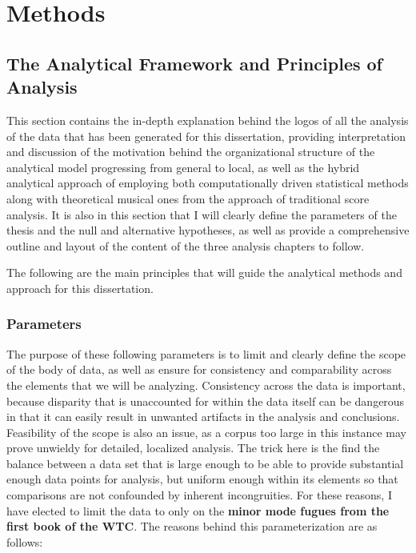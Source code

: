     
    
    
    

    \hypertarget{Methods}{\chapter{Methods}\label{Methods}}
    \section{The Analytical Framework and Principles of
Analysis}\label{the-analytical-framework-and-principles-of-analysis}

    This section contains the in-depth explanation behind the logos of all
the analysis of the data that has been generated for this dissertation,
providing interpretation and discussion of the motivation behind the
organizational structure of the analytical model progressing from
general to local, as well as the hybrid analytical approach of employing
both computationally driven statistical methods along with theoretical
musical ones from the approach of traditional score analysis. It is also
in this section that I will clearly define the parameters of the thesis
and the null and alternative hypotheses, as well as provide a
comprehensive outline and layout of the content of the three analysis
chapters to follow.

The following are the main principles that will guide the analytical
methods and approach for this dissertation.

    \subsection{Parameters}\label{parameters}

The purpose of these following parameters is to limit and clearly define
the scope of the body of data, as well as ensure for consistency and
comparability across the elements that we will be analyzing. Consistency
across the data is important, because disparity that is unaccounted for
within the data itself can be dangerous in that it can easily result in
unwanted artifacts in the analysis and conclusions. Feasibility of the
scope is also an issue, as a corpus too large in this instance may prove
unwieldy for detailed, localized analysis. The trick here is the find
the balance between a data set that is large enough to be able to
provide substantial enough data points for analysis, but uniform enough
within its elements so that comparisons are not confounded by inherent
incongruities. For these reasons, I have elected to limit the data to
only on the \textbf{minor mode fugues from the first book of the WTC}.
The reasons behind this parameterization are as follows:

